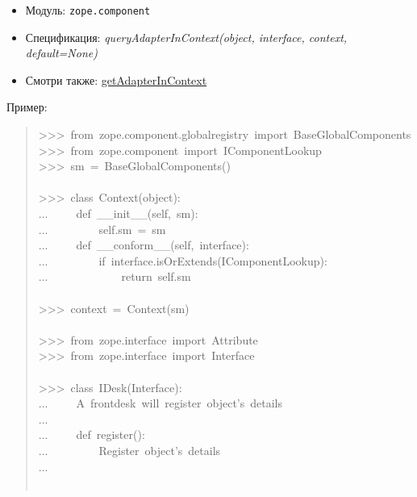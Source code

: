 \documentclass[14pt,a4paper,openany,twoside,final]{extbook}
\providecommand*{\DUroletitlereference}[1]{\textsl{#1}}
\begin{document}
\begin{itemize}

\item Модуль: \texttt{zope.component}

\item Спецификация: \DUroletitlereference{queryAdapterInContext(object, interface, context,
default=None)}

\item Смотри также: \hyperref[getadapterincontext]{getAdapterInContext}

\end{itemize}

Пример:

\begin{quote}{\ttfamily \raggedright \noindent
>{}>{}>~from~zope.component.globalregistry~import~BaseGlobalComponents\\
>{}>{}>~from~zope.component~import~IComponentLookup\\
>{}>{}>~sm~=~BaseGlobalComponents()\\
~\\
>{}>{}>~class~Context(object):\\
...~~~~~def~\_\_init\_\_(self,~sm):\\
...~~~~~~~~~self.sm~=~sm\\
...~~~~~def~\_\_conform\_\_(self,~interface):\\
...~~~~~~~~~if~interface.isOrExtends(IComponentLookup):\\
...~~~~~~~~~~~~~return~self.sm\\
~\\
>{}>{}>~context~=~Context(sm)\\
~\\
>{}>{}>~from~zope.interface~import~Attribute\\
>{}>{}>~from~zope.interface~import~Interface\\
~\\
>{}>{}>~class~IDesk(Interface):\\
...~~~~~\textquotedbl{}\textquotedbl{}\textquotedbl{}A~frontdesk~will~register~object's~details\textquotedbl{}\textquotedbl{}\textquotedbl{}\\
...\\
...~~~~~def~register():\\
...~~~~~~~~~\textquotedbl{}\textquotedbl{}\textquotedbl{}Register~object's~details\textquotedbl{}\textquotedbl{}\textquotedbl{}\\
...\\
~\\
}
\end{quote}
\end{document}
